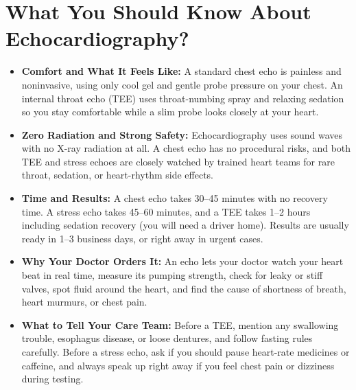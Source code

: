 \section{What You Should Know About Echocardiography?}
\begin{itemize}
\item \textbf{Comfort and What It Feels Like:} A standard chest echo is painless and noninvasive, using only cool gel and gentle probe pressure on your chest. An internal throat echo (TEE) uses throat-numbing spray and relaxing sedation so you stay comfortable while a slim probe looks closely at your heart.
\item \textbf{Zero Radiation and Strong Safety:} Echocardiography uses sound waves with no X-ray radiation at all. A chest echo has no procedural risks, and both TEE and stress echoes are closely watched by trained heart teams for rare throat, sedation, or heart-rhythm side effects.
\item \textbf{Time and Results:} A chest echo takes 30--45 minutes with no recovery time. A stress echo takes 45--60 minutes, and a TEE takes 1--2 hours including sedation recovery (you will need a driver home). Results are usually ready in 1--3 business days, or right away in urgent cases.
\item \textbf{Why Your Doctor Orders It:} An echo lets your doctor watch your heart beat in real time, measure its pumping strength, check for leaky or stiff valves, spot fluid around the heart, and find the cause of shortness of breath, heart murmurs, or chest pain.
\item \textbf{What to Tell Your Care Team:} Before a TEE, mention any swallowing trouble, esophagus disease, or loose dentures, and follow fasting rules carefully. Before a stress echo, ask if you should pause heart-rate medicines or caffeine, and always speak up right away if you feel chest pain or dizziness during testing.
\end{itemize}


